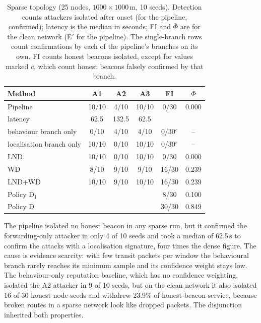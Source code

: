 \documentclass[pdflatex,sn-mathphys-num]{sn-jnl}%
\theoremstyle{thmstyleone}%
\theoremstyle{thmstyletwo}%
\theoremstyle{thmstylethree}%
\begin{document}
\begin{table}[!t]
\caption{Sparse topology (25 nodes, $1000 \times 1000$\,m, 10 seeds).
Detection counts attackers isolated after onset (for the pipeline, confirmed);
latency is the median in seconds; FI and $\bar\Phi$ are for the clean network
(E$'$ for the pipeline). The single-branch rows count confirmations by each of
the pipeline's branches on its own. FI counts honest beacons isolated, except
for values marked $c$, which count honest beacons falsely confirmed by that
branch.}
\label{tab:sparse}
\centering
\footnotesize
\setlength{\tabcolsep}{4pt}
\begin{tabular}{@{}lccccc@{}}
\toprule
Method & A1 & A2 & A3 & FI & $\bar\Phi$ \\
\midrule
Pipeline & 10/10 & 4/10 & 10/10 & 0/30 & 0.000 \\
\quad latency & 62.5 & 132.5 & 62.5 & & \\
\quad behaviour branch only & 0/10 & 4/10 & 4/10 & 0/30$^{c}$ & -- \\
\quad localisation branch only & 10/10 & 0/10 & 10/10 & 0/30$^{c}$ & -- \\
LND & 10/10 & 0/10 & 10/10 & 0/30 & 0.000 \\
WD & 8/10 & 9/10 & 9/10 & 16/30 & 0.239 \\
LND+WD & 10/10 & 9/10 & 10/10 & 16/30 & 0.239 \\
Policy D$_1$ & & & & 8/30 & 0.100 \\
Policy D & & & & 30/30 & 0.849 \\
\bottomrule
\end{tabular}
\end{table}

The pipeline isolated no honest beacon in any sparse run, but it confirmed
the forwarding-only attacker in only 4 of 10 seeds and took a median of
62.5\,s to confirm the attacks with a localisation signature, four times the
dense figure. The cause is evidence scarcity: with few transit packets per
window the behavioural branch rarely reaches its minimum sample and its
confidence weight stays low. The behaviour-only reputation baseline, which
has no confidence weighting, isolated the A2 attacker in 9 of 10 seeds, but
on the clean network it also isolated 16 of 30 honest node-seeds and withdrew
23.9\% of honest-beacon service, because broken routes in a sparse network
look like dropped packets. The disjunction inherited both properties.
\end{document}
